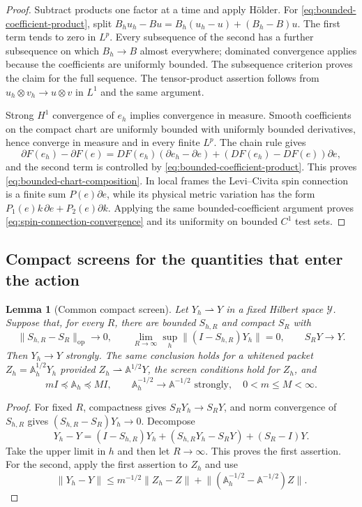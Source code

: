 \documentclass[11pt]{article}
\numberwithin{equation}{section}
\newtheorem{lemma}[lemma]{Lemma}
\theoremstyle{definition}
\theoremstyle{remark}
\newcommand{\norm}[1]{\lVert#1\rVert}
\begin{document}
\begin{proof}
Subtract products one factor at a time and apply H\"older.  For
\eqref{eq:bounded-coefficient-product}, split
$B_hu_h-Bu=B_h(u_h-u)+(B_h-B)u$.  The first term tends to zero in
$L^p$.  Every subsequence of the second has a further subsequence on which
$B_h\to B$ almost everywhere; dominated convergence applies because the
coefficients are uniformly bounded.  The subsequence criterion proves the
claim for the full sequence.  The tensor-product assertion follows from
$u_h\otimes v_h\to u\otimes v$ in $L^1$ and the same argument.

Strong $H^1$ convergence of $e_h$ implies convergence in measure.  Smooth
coefficients on the compact chart are uniformly bounded with uniformly
bounded derivatives, hence converge in measure and in every finite $L^p$.
The chain rule gives
\[
 \partial F(e_h)-\partial F(e)
 =DF(e_h)(\partial e_h-\partial e)
  +(DF(e_h)-DF(e))\partial e,
\]
and the second term is controlled by
\eqref{eq:bounded-coefficient-product}.  This proves
\eqref{eq:bounded-chart-composition}.  In local frames the Levi--Civita spin
connection is a finite sum $P(e)\partial e$, while its physical metric
variation has the form
$P_1(e)k\,\partial e+P_2(e)\partial k$.  Applying the same
bounded-coefficient argument proves \eqref{eq:spin-connection-convergence}
and its uniformity on bounded $C^1$ test sets.
\end{proof}

\subsection{Compact screens for the quantities that enter the action}

\begin{lemma}[Common compact screen]
\label{lem:screen}
Let $Y_h\rightharpoonup Y$ in a fixed Hilbert space $\mathcal Y$. Suppose that, for every $R$, there are bounded $S_{h,R}$ and compact $S_R$ with
\begin{equation}
 \norm{S_{h,R}-S_R}_{\mathrm{op}}\longrightarrow0,
 \qquad
 \lim_{R\to\infty}\sup_h\norm{(I-S_{h,R})Y_h}=0,
 \qquad S_RY\longrightarrow Y.
 \label{eq:screen}
\end{equation}
Then $Y_h\to Y$ strongly. The same conclusion holds for a whitened packet $Z_h=\mathbb A_h^{1/2}Y_h$ provided $Z_h\rightharpoonup\mathbb A^{1/2}Y$, the screen conditions hold for $Z_h$, and
\[
 mI\preceq\mathbb A_h\preceq MI,
 \qquad \mathbb A_h^{-1/2}\to\mathbb A^{-1/2}\text{ strongly},
 \quad 0<m\le M<\infty.
\]
\end{lemma}
\begin{proof}
For fixed $R$, compactness gives $S_RY_h\to S_RY$, and norm convergence of $S_{h,R}$ gives $(S_{h,R}-S_R)Y_h\to0$. Decompose
\[
 Y_h-Y=(I-S_{h,R})Y_h+(S_{h,R}Y_h-S_RY)+(S_R-I)Y.
\]
Take the upper limit in $h$ and then let $R\to\infty$. This proves the first assertion. For the second, apply the first assertion to $Z_h$ and use
\[
 \norm{Y_h-Y}\le m^{-1/2}\norm{Z_h-Z}
   +\norm{(\mathbb A_h^{-1/2}-\mathbb A^{-1/2})Z}.
\]
\end{proof}
\end{document}
